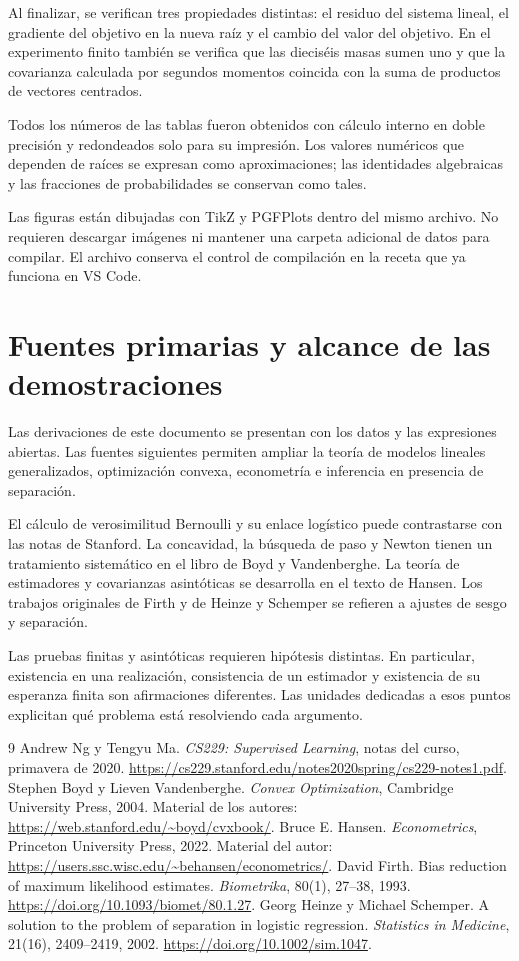 \documentclass[11pt,a4paper]{article}
\begin{document}
Al finalizar, se verifican tres propiedades distintas:
el residuo del sistema lineal, el gradiente del objetivo
en la nueva raíz y el cambio del valor del objetivo.
En el experimento finito también se verifica que
las dieciséis masas sumen uno y que la covarianza
calculada por segundos momentos coincida con la
suma de productos de vectores centrados.

Todos los números de las tablas fueron obtenidos
con cálculo interno en doble precisión y redondeados
solo para su impresión.
Los valores numéricos que dependen de raíces se expresan
como aproximaciones; las identidades algebraicas
y las fracciones de probabilidades se conservan como tales.

Las figuras están dibujadas con TikZ y PGFPlots dentro
del mismo archivo. No requieren descargar imágenes
ni mantener una carpeta adicional de datos para compilar.
El archivo conserva el control de compilación en la
receta que ya funciona en VS Code.

\clearpage
\section{Fuentes primarias y alcance de las demostraciones}\label{logit150}
Las derivaciones de este documento se presentan con
los datos y las expresiones abiertas.
Las fuentes siguientes permiten ampliar la teoría
de modelos lineales generalizados, optimización convexa,
econometría e inferencia en presencia de separación.

El cálculo de verosimilitud Bernoulli y su enlace logístico
puede contrastarse con las notas de Stanford.
La concavidad, la búsqueda de paso y Newton tienen
un tratamiento sistemático en el libro de Boyd y Vandenberghe.
La teoría de estimadores y covarianzas asintóticas
se desarrolla en el texto de Hansen.
Los trabajos originales de Firth y de Heinze y Schemper
se refieren a ajustes de sesgo y separación.

Las pruebas finitas y asintóticas requieren hipótesis distintas.
En particular, existencia en una realización, consistencia
de un estimador y existencia de su esperanza finita
son afirmaciones diferentes.
Las unidades dedicadas a esos puntos explicitan
qué problema está resolviendo cada argumento.

\begin{thebibliography}{9}
Andrew Ng y Tengyu Ma.
\emph{CS229: Supervised Learning}, notas del curso, primavera de 2020.
\url{https://cs229.stanford.edu/notes2020spring/cs229-notes1.pdf}.
Stephen Boyd y Lieven Vandenberghe.
\emph{Convex Optimization}, Cambridge University Press, 2004.
Material de los autores:
\url{https://web.stanford.edu/~boyd/cvxbook/}.
Bruce E. Hansen.
\emph{Econometrics}, Princeton University Press, 2022.
Material del autor:
\url{https://users.ssc.wisc.edu/~behansen/econometrics/}.
David Firth.
Bias reduction of maximum likelihood estimates.
\emph{Biometrika}, 80(1), 27--38, 1993.
\url{https://doi.org/10.1093/biomet/80.1.27}.
Georg Heinze y Michael Schemper.
A solution to the problem of separation in logistic regression.
\emph{Statistics in Medicine}, 21(16), 2409--2419, 2002.
\url{https://doi.org/10.1002/sim.1047}.
\end{thebibliography}
\end{document}
